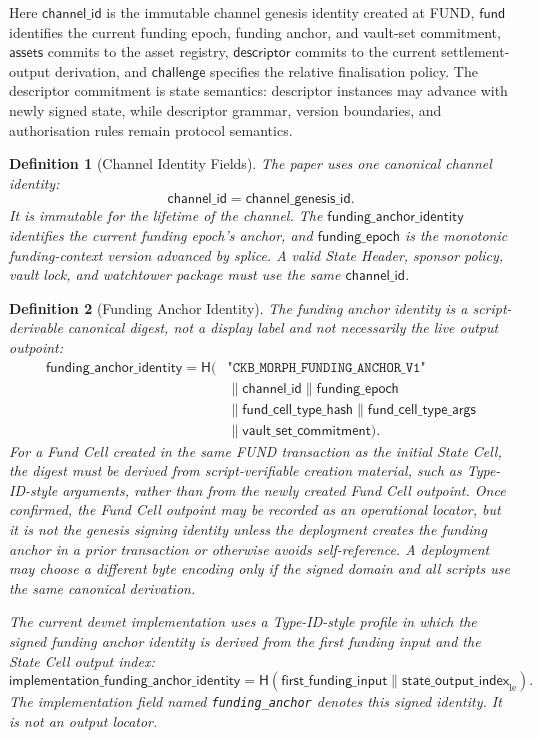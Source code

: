 \documentclass[a4paper,11pt]{article}
\newtheorem{definition}{Definition}
\newcommand{\hash}{\mathsf{H}}
\begin{document}
\noindent Here $\mathsf{channel\_id}$ is the immutable channel genesis identity created at \textsf{FUND}, $\mathsf{fund}$ identifies the current funding epoch, funding anchor, and vault-set commitment, $\mathsf{assets}$ commits to the asset registry, $\mathsf{descriptor}$ commits to the current settlement-output derivation, and $\mathsf{challenge}$ specifies the relative finalisation policy. The descriptor commitment is state semantics: descriptor instances may advance with newly signed state, while descriptor grammar, version boundaries, and authorisation rules remain protocol semantics.

\begin{definition}[Channel Identity Fields]
The paper uses one canonical channel identity:
\[
\mathsf{channel\_id}=\mathsf{channel\_genesis\_id}.
\]
It is immutable for the lifetime of the channel. The
$\mathsf{funding\_anchor\_identity}$ identifies the current funding epoch's
anchor, and $\mathsf{funding\_epoch}$ is the monotonic funding-context version
advanced by splice. A valid State Header, sponsor policy, vault lock, and
watchtower package must use the same $\mathsf{channel\_id}$.
\end{definition}

\begin{definition}[Funding Anchor Identity]
The funding anchor identity is a script-derivable canonical digest, not a
display label and not necessarily the live output outpoint:
\[
\begin{aligned}
\mathsf{funding\_anchor\_identity} =
\hash(&\texttt{"CKB\_MORPH\_FUNDING\_ANCHOR\_V1"}\\
&\parallel \mathsf{channel\_id}
\parallel \mathsf{funding\_epoch}\\
&\parallel \mathsf{fund\_cell\_type\_hash}
\parallel \mathsf{fund\_cell\_type\_args}\\
&\parallel \mathsf{vault\_set\_commitment}).
\end{aligned}
\]
For a Fund Cell created in the same \textsf{FUND} transaction as the initial
State Cell, the digest must be derived from script-verifiable creation material,
such as Type-ID-style arguments, rather than from the newly created Fund Cell
outpoint. Once confirmed, the Fund Cell outpoint may be recorded as an
operational locator, but it is not the genesis signing identity unless the
deployment creates the funding anchor in a prior transaction or otherwise
avoids self-reference. A deployment may choose a different byte encoding only if
the signed domain and all scripts use the same canonical derivation.

The current devnet implementation uses a Type-ID-style profile in which the
signed funding anchor identity is derived from the first funding input and the
State Cell output index:
\[
\mathsf{implementation\_funding\_anchor\_identity}
=\hash(\mathsf{first\_funding\_input}\parallel
\mathsf{state\_output\_index}_{\mathrm{le}}).
\]
The implementation field named \texttt{funding\_anchor} denotes this signed
identity. It is not an output locator.
\end{definition}
\end{document}
